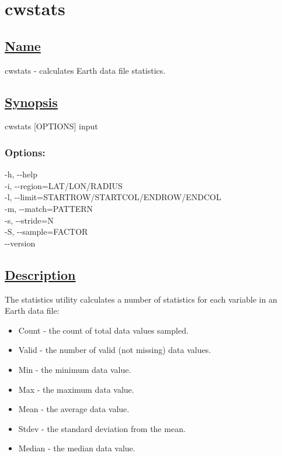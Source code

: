 \newpage
\section{cwstats} \hypertarget{cwstats}{}
\subsection*{\underline{Name}}


   cwstats - calculates Earth data file statistics.  
\subsection*{\underline{Synopsis}}


  cwstats [OPTIONS] input 
\subsubsection*{Options:}


  -h, -{-}help \\ 
 -i, -{-}region=LAT/LON/RADIUS \\ 
 -l, -{-}limit=STARTROW/STARTCOL/ENDROW/ENDCOL \\ 
 -m, -{-}match=PATTERN \\ 
 -s, -{-}stride=N \\ 
 -S, -{-}sample=FACTOR \\ 
 -{-}version \\ 

\subsection*{\underline{Description}}


  The statistics utility calculates a number of statistics for each variable in an Earth data file:
\begin{itemize}
\item  Count - the count of total data values sampled. 
\item  Valid - the number of valid (not missing) data values. 
\item  Min - the minimum data value. 
\item  Max - the maximum data value. 
\item  Mean - the average data value. 
\item  Stdev - the standard deviation from the mean. 
\item  Median - the median data value. 

\end{itemize}


